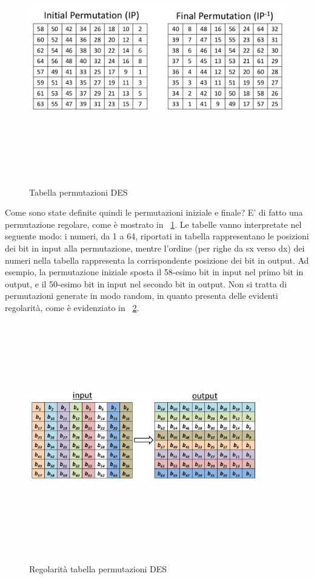 \begin{figure}[htbp]
	\centering%
	\subfigure%
	{\includegraphics[height=10cm, width=13cm, keepaspectratio]{Immagini/Capitolo2/des_perm.png}}
	\caption{Tabella permutazioni DES \label{fig:des_perm}} 	
\end{figure}
Come sono state definite quindi le permutazioni iniziale e finale? E' di fatto una permutazione regolare, come è mostrato in \figurename ~\ref{fig:des_perm}. Le tabelle vanno interpretate nel seguente modo: i numeri, da 1 a 64, riportati in tabella rappresentano le posizioni dei bit in input alla permutazione, mentre l’ordine (per righe da sx verso dx) dei numeri nella tabella rappresenta la corrispondente posizione dei bit in output. Ad esempio, la permutazione iniziale sposta il 58-esimo bit in input nel primo bit in output, e il 50-esimo bit in input nel secondo bit in output. Non si tratta di permutazioni generate in modo random, in quanto presenta delle evidenti regolarità, come è evidenziato in \figurename ~\ref{fig:des_perm_2}.
\begin{figure}[htbp]
	\centering%
	\subfigure%
	{\includegraphics[height=10cm, width=10cm, keepaspectratio]{Immagini/Capitolo2/des_perm_2.png}}
	\caption{Regolarità tabella permutazioni DES \label{fig:des_perm_2}} 	
\end{figure}
